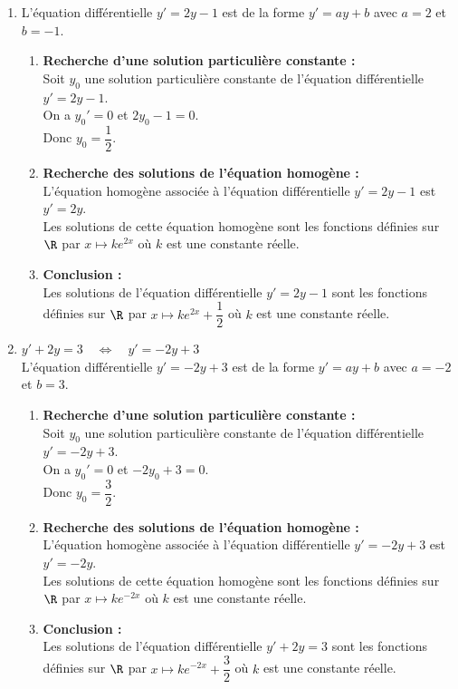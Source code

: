 \documentclass[a4paper,11pt,exos]{nsi} %
\begin{document}
\textcolor{UGLiBlue}{
    \begin{enumerate}
        \item L'équation différentielle $y'=2y-1$ est de la forme $y'=ay+b$ avec $a=2$ et $b=-1$.
        \begin{enumerate}[label=\textbullet]
            \item \textbf{Recherche d'une solution particulière constante :}\\
            Soit $y_0$ une solution particulière constante de l'équation différentielle $y'=2y-1$.\\
            On a $y_0'=0$ et $2y_0-1=0$.\\
            Donc $y_0=\dfrac{1}{2}$.
            \item \textbf{Recherche des solutions de l'équation homogène :}\\
            L'équation homogène associée à l'équation différentielle $y'=2y-1$ est $y'=2y$.\\
            Les solutions de cette équation homogène sont les fonctions définies sur $\R$ par $x\mapsto ke^{2x}$ où $k$ est une constante réelle.
            \item \textbf{Conclusion :}\\
            Les solutions de l'équation différentielle $y'=2y-1$ sont les fonctions définies sur $\R$ par $x\mapsto ke^{2x}+ \dfrac{1}{2}$ où $k$ est une constante réelle.
        \end{enumerate}
        \item $y'+2y=3 \quad \iff \quad y'=-2y+3$\\
        L'équation différentielle $y'=-2y+3$ est de la forme $y'=ay+b$ avec $a=-2$ et $b=3$.
        \begin{enumerate}[label=\textbullet]
            \item \textbf{Recherche d'une solution particulière constante :}\\
            Soit $y_0$ une solution particulière constante de l'équation différentielle $y'=-2y+3$.\\
            On a $y_0'=0$ et $-2y_0+3=0$.\\
            Donc $y_0=\dfrac{3}{2}$.
            \item \textbf{Recherche des solutions de l'équation homogène :}\\
            L'équation homogène associée à l'équation différentielle $y'=-2y+3$ est $y'=-2y$.\\
            Les solutions de cette équation homogène sont les fonctions définies sur $\R$ par $x\mapsto ke^{-2x}$ où $k$ est une constante réelle.
            \item \textbf{Conclusion :}\\
            Les solutions de l'équation différentielle $y'+2y=3$ sont les fonctions définies sur $\R$ par $x\mapsto ke^{-2x}+ \dfrac{3}{2}$ où $k$ est une constante réelle.
        \end{enumerate}
    \end{enumerate}
}
\end{document}
